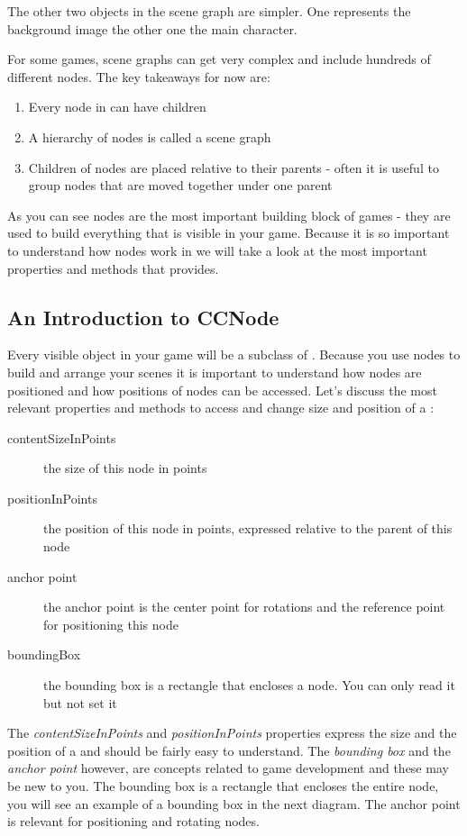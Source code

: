The other two objects in the scene graph are simpler. One represents the
background image the other one the main character.

For some games, scene graphs can get very complex and include hundreds of
different nodes. The key takeaways for now are:

\begin{enumerate}
  \item Every node in \cocos{} can have children
  \item A hierarchy of nodes is called a scene graph
  \item Children of nodes are placed relative to their parents - often it is
  useful to group nodes that are moved together under one parent
\end{enumerate}

As you can see nodes are the most important building block of \cocos{} games -
they are used to build everything that is visible in your game. Because it
is so important to understand how nodes work in \cocos{} we will take a look at
the most important properties and methods that \ccnode{} provides.

\subsection{An Introduction to CCNode}
Every visible object in your game will be a subclass of \ccnode{}. Because
you use nodes to build and arrange your scenes it is important to understand
how nodes are positioned and how positions of nodes can be accessed. Let's
discuss the most relevant properties and methods to access and change
size and position of a \ccnode{}:

\begin{description}
\item[contentSizeInPoints] the size of this node in points
\item[positionInPoints] the position of this node in points, expressed relative
to the parent of this node
\item[anchor point] the anchor point is the center point for rotations and the reference point for positioning this node
\item[boundingBox] the bounding box is a rectangle that encloses a node. You can
only read it but not set it
\end{description}

The \textit{contentSizeInPoints} and \textit{positionInPoints} properties
express the size and the position of a \ccnode{} and should be fairly easy to
understand. The \textit{bounding box} and the \textit{anchor point} however, are
concepts related to game development and these may be new to you. The bounding
box is a rectangle that encloses the entire node, you will see an example of a
bounding box in the next diagram. The anchor point is relevant for positioning
and rotating nodes.

